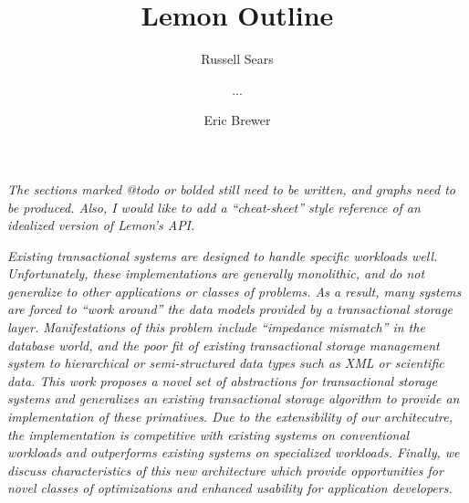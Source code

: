 \documentclass[letterpaper,twocolumn,english]{article}
\newcommand{\yad}{Lemon\xspace}
\begin{document}
\title{\yad Outline }


\author{Russell Sears \and ... \and Eric Brewer}

\maketitle




{\em The sections marked @todo or bolded still need to be written, and
graphs need to be produced.  Also, I would like to add a
``cheat-sheet'' style reference of an idealized version of \yad's
API.}
\vspace*{6pt}

{\em Existing transactional systems are designed to handle specific
workloads well.  Unfortunately, these implementations are generally
monolithic, and do not generalize to other applications or classes of
problems.  As a result, many systems are forced to ``work around'' the
data models provided by a transactional storage layer. Manifestations
of this problem include ``impedance mismatch'' in the database world,
and the poor fit of existing transactional storage management system
to hierarchical or semi-structured data types such as XML or
scientific data.  This work proposes a novel set of abstractions for
transactional storage systems and generalizes an existing
transactional storage algorithm to provide an implementation of these
primatives.  Due to the extensibility of our architecutre, the
implementation is competitive with existing systems on conventional
workloads and outperforms existing systems on specialized
workloads.  Finally, we discuss characteristics of this new
architecture which provide opportunities for novel classes of
optimizations and enhanced usability for application developers.}

\end{document}
